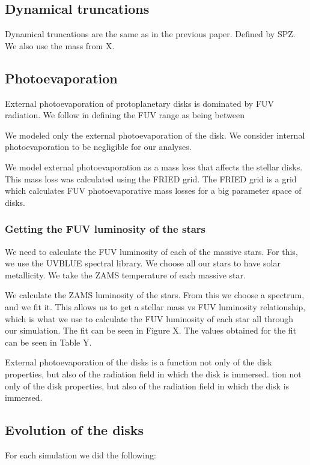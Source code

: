 \documentclass[fleqn,usenatbib]{mnras}
\begin{document}
\subsection{Dynamical truncations}
Dynamical truncations are the same as in the previous paper. Defined by SPZ. We also use the mass from X.

\subsection{Photoevaporation}
External photoevaporation of protoplanetary disks is dominated by FUV radiation. We follow \citet{adams_photoevaporation_2004} in defining the FUV range as being between 


We modeled only the external photoevaporation of the disk. We consider internal photoevaporation to be negligible for our analyses.

We model external photoevaporation as a mass loss that affects the stellar disks. This mass loss was calculated using the FRIED grid. The FRIED grid is a grid which calculates FUV photoevaporative mass losses for a big parameter space of disks. 

\subsubsection{Getting the FUV luminosity of the stars}
We need to calculate the FUV luminosity of each of the massive stars. For this, we use the UVBLUE spectral library. We choose all our stars to have solar metallicity. We take the ZAMS temperature of each massive star.

We calculate the ZAMS luminosity of the stars. From this we choose a spectrum, and we fit it. This allows us to get a stellar mass vs FUV luminosity relationship, which is what we use to calculate the FUV luminosity of each star all through our simulation. The fit can be seen in Figure X. The values obtained for the fit can be seen in Table Y.

External photoevaporation of the disks is a function not only of the disk properties, but also of the radiation field in which the disk is immersed. tion not only of the disk properties, but also of the radiation field in which the disk is immersed. 

\subsection{Evolution of the disks}
For each simulation we did the following:
\end{document}
